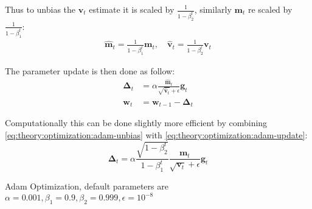 Thus to unbias the $\mathbf{v}_t$ estimate it is scaled by $\frac{1}{1 - \beta_2^t}$, similarly $\mathbf{m}_t$ re scaled by $\frac{1}{1 - \beta_1^t}$:
\begin{equation}
\begin{aligned}
\hat{\mathbf{m}}_t = \frac{1}{1 - \beta_1^t} \mathbf{m}_t, \quad \hat{\mathbf{v}}_t = \frac{1}{1 - \beta_2^t} \mathbf{v}_t
\end{aligned}
\label{eq:theory:optimization:adam-unbias}
\end{equation}

The parameter update is then done as follow:
\begin{equation}
\begin{aligned}
{\boldsymbol\Delta}_t &= \alpha \frac{\hat{\mathbf{m}}_t}{\sqrt{\hat{\mathbf{v}}_t} + \epsilon} \mathbf{g}_t \\
\mathbf{w}_t &= \mathbf{w}_{t-1} - {\boldsymbol\Delta}_t
\end{aligned}
\label{eq:theory:optimization:adam-update}
\end{equation}

Computationally this can be done slightly more efficient by combining \eqref{eq:theory:optimization:adam-unbias} with \eqref{eq:theory:optimization:adam-update}:
\begin{equation}
{\boldsymbol\Delta}_t = \alpha \frac{\sqrt{1 - \beta_2^t}}{1 - \beta_1^t} \frac{\mathbf{m}_t}{\sqrt{\mathbf{v}_t} + \epsilon} \mathbf{g}_t
\end{equation}


\begin{algorithm}[H]
  \caption{Adam Optimization, default parameters are $\alpha=0.001, \beta_1=0.9, \beta_2=0.999, \epsilon=10^{-8}$}
  \begin{algorithmic}[1]
      \Repeat
      \State {}
    \EndFunction
  \end{algorithmic}
\end{algorithm}

